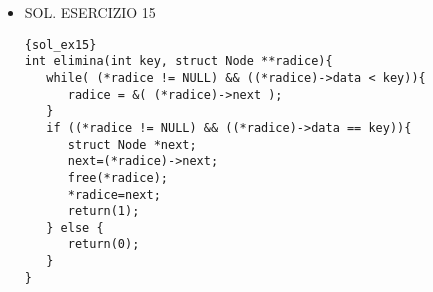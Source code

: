 \begin{itemize}
\begin{lstlisting}{sol_ex12}
    printf("Creazione linked list con %d elementi\n", k);

    for (int i = 0; i < k; i++) {
        printf("Inserisci l'elmento %d: ", i);
        scanf("%d", &inputValue);

        if (i == 0) {
            head = (struct Node*) malloc(sizeof(struct Node)); 
            head->data = inputValue;
            head->next = NULL;
            
            tail = head;
        } else {
            tmp = (struct Node*) malloc(sizeof(struct Node)); 
            tmp->data = inputValue;
            tmp->next = NULL;

            tail->next = tmp;
            tail = tmp;
        }
    }

    return head;
}
\end{lstlisting}

    \item [] SOL. ESERCIZIO 15 
\begin{lstlisting}{sol_ex15}  
int elimina(int key, struct Node **radice){
   while( (*radice != NULL) && ((*radice)->data < key)){
      radice = &( (*radice)->next );
   }
   if ((*radice != NULL) && ((*radice)->data == key)){  
      struct Node *next;
      next=(*radice)->next;
      free(*radice);
      *radice=next;
      return(1);
   } else {
      return(0);
   }
}
\end{lstlisting}


\end{itemize}



